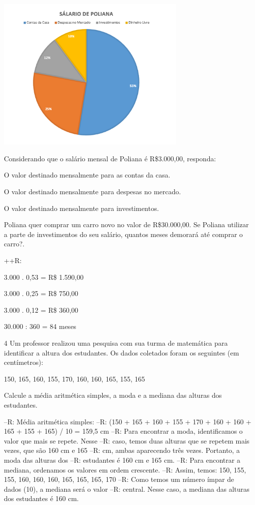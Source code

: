 {\includegraphics[width=3.65in,height=2.98179in]{./imgSAEB_8_MAT/media/image41.png}

Considerando que o salário mensal de Poliana é R\$3.000,00, responda:
\item O valor destinado mensalmente para as contas da casa.
\item O valor destinado mensalmente para despesas no mercado.
\item O valor destinado mensalmente para investimentos.
\item Poliana quer comprar um carro novo no valor de R\$30.000,00. Se
Poliana utilizar a parte de investimentos do seu salário, quantos meses
demorará até comprar o carro?.

++R:
\item 3.000 . 0,53 = R\$ 1.590,00
\item 3.000 . 0,25 = R\$ 750,00
\item 3.000 . 0,12 = R\$ 360,00
\item 30.000 : 360 = 84 meses

\num{4} Um professor realizou uma pesquisa com sua turma de matemática para
identificar a altura dos estudantes. Os dados coletados foram os
seguintes (em centímetros):

150, 165, 160, 155, 170, 160, 160, 165, 155, 165

Calcule a média aritmética simples, a moda e a mediana das alturas dos
estudantes.

--R: Média aritmética simples:
--R: (150 + 165 + 160 + 155 + 170 + 160 + 160 + 165 + 155 + 165) / 10 = 159,5 cm
--R: Para encontrar a moda, identificamos o valor que mais se repete. Nesse
--R: caso, temos duas alturas que se repetem mais vezes, que são 160 cm e 165
--R: cm, ambas aparecendo três vezes. Portanto, a moda das alturas dos
--R: estudantes é 160 cm e 165 cm.
--R: Para encontrar a mediana, ordenamos os valores em ordem crescente.
--R: Assim, temos: 150, 155, 155, 160, 160, 160, 165, 165, 165, 170
--R: Como temos um número ímpar de dados (10), a mediana será o valor
--R: central. Nesse caso, a mediana das alturas dos estudantes é 160 cm.

}
